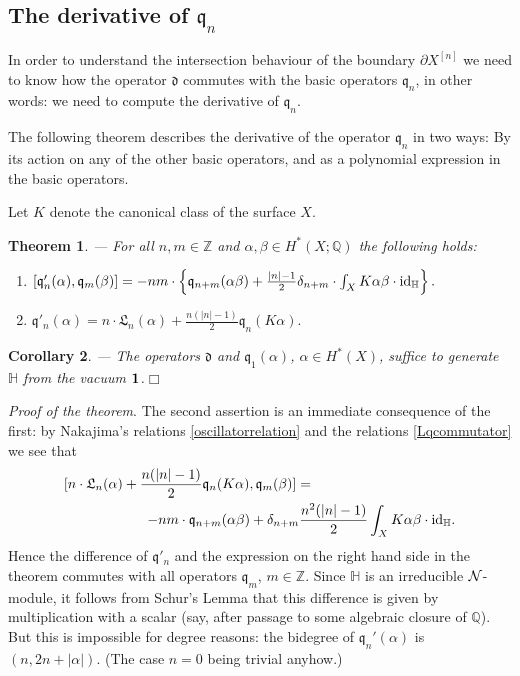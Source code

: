 \documentclass[twoside,11pt]{article}
\newtheorem{theorem}{Theorem}[section]
\newtheorem{corollary}[theorem]{Corollary}
\newcommand{\prfofthetheorem}{{\kursiv Proof of the theorem}. }
\newcommand{\qed}{\hspace*{\fill}$\Box$\vspace{2ex}}
\newcommand{\kursiv}{\sl}
\newcommand{\kn}{{\cal N}}
\newcommand{\IH}{{\mathbb H}}
\newcommand{\IQ}{{\mathbb Q}}
\newcommand{\IZ}{{\mathbb Z}}
\newcommand{\gothd}{{\mathfrak d}}
\newcommand{\gothq}{{\mathfrak q}}
\newcommand{\gothL}{{\mathfrak L}}
\newcommand{\dd}{\gothd}
\newcommand{\qq}{\gothq}
\newcommand{\LL}{\gothL}
\newcommand{\vacuum}{{\bf 1}}
\newcommand{\id}{{\rm id}}
\begin{document}
\subsection{The derivative of $\qq_n$}

In order to understand the intersection behaviour of the boundary $\partial
X^{[n]}$ we need to know how the operator $\dd$ commutes with the 
basic operators $\qq_n$, in other words: we need to compute the derivative of 
$\qq_n$.

The following theorem describes the derivative of the operator $\qq_n$ in two ways:
By its action on any of the other basic operators, and as a polynomial
expression in the basic operators.

Let $K$ denote the canonical class of the surface $X$.

\begin{theorem}\label{maintheorem}--- For all  $n,m\in\IZ$ and  $\alpha,\beta\in H^*(X;\IQ)$ the following holds:
\begin{enumerate}
\item
$[\qq_n'(\alpha),\qq_m(\beta)]=-nm\cdot\left\{\qq_{n+m}(\alpha\beta)
+\frac{|n|-1}{2}\delta_{n+m}\cdot\int_XK\alpha\beta\cdot\id_{\IH}\right\}.$
\item
$\qq'_n(\alpha)=n\cdot\LL_n(\alpha)+\frac{n(|n|-1)}{2}\qq_n(K\alpha).$
\end{enumerate}
\end{theorem}


\begin{corollary}\label{q1machtsallein}--- The operators $\dd$ and $\qq_1(\alpha)$, $\alpha\in H^*(X)$, suffice to generate $\IH$ from the 
vacuum $\vacuum$.\qed
\end{corollary}


\prfofthetheorem The second assertion is an immediate consequence of the first:
by Nakajima's relations \ref{oscillatorrelation} and the relations
\ref{Lqcommutator} we see that
\begin{eqnarray*}\lefteqn{[n\cdot\LL_n(\alpha)+\frac{n(|n|-1)}{2}\qq_n(K\alpha),\qq_m(\beta)]=}
\hspace{5em}\\
&&-nm\cdot\qq_{n+m}(\alpha\beta)+\delta_{n+m}\frac{n^2(|n|-1)}{2}\int_{X}K\alpha\beta\cdot\id_{\IH}.
\end{eqnarray*}
Hence the difference of $\qq'_n$ and the expression on the right hand side
in the theorem commutes with all operators $\qq_m$, $m\in \IZ$. Since $\IH$ is 
an irreducible $\kn$-module, it follows from Schur's Lemma that this difference
is given by multiplication with a scalar
(say, after passage to some algebraic closure of $\IQ$). But this
is impossible for degree reasons: the bidegree of $\qq_n'(\alpha)$ is
$(n,2n+|\alpha|)$. (The case $n=0$ being trivial anyhow.)
\end{document}
